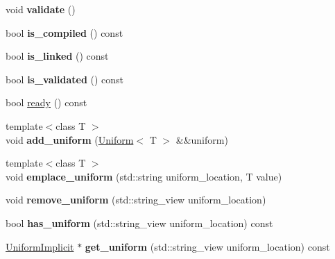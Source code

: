 \begin{DoxyCompactItemize}
\mbox{\label{class_shader_a63abb0b416f458680586b5606d8a4826}} 
void {\bfseries validate} ()
\item 
\mbox{\label{class_shader_a7d734904868dd336e52071d92230bbeb}} 
bool {\bfseries is\+\_\+compiled} () const
\item 
\mbox{\label{class_shader_a9eb0765e36b74d8dcd4afb62df04d024}} 
bool {\bfseries is\+\_\+linked} () const
\item 
\mbox{\label{class_shader_a731afb1a870977aa3eb91168f752b2e8}} 
bool {\bfseries is\+\_\+validated} () const
\item 
bool \mbox{\hyperlink{class_shader_a8053fc5d01642d3d985e233835065e13}{ready}} () const
\item 
\mbox{\label{class_shader_a2f7b0cd2bd3226c76ea2f766a59fbb58}} 
{\footnotesize template$<$class T $>$ }\\void {\bfseries add\+\_\+uniform} (\mbox{\hyperlink{class_uniform}{Uniform}}$<$ T $>$ \&\&uniform)
\item 
\mbox{\label{class_shader_ae34ad0d3352ed22322dcbe1d1ef0740b}} 
{\footnotesize template$<$class T $>$ }\\void {\bfseries emplace\+\_\+uniform} (std\+::string uniform\+\_\+location, T value)
\item 
\mbox{\label{class_shader_a46dbb0b323be10d61496452cde5aa756}} 
void {\bfseries remove\+\_\+uniform} (std\+::string\+\_\+view uniform\+\_\+location)
\item 
\mbox{\label{class_shader_a370621cc5d76a859ee9a610dc8b27d82}} 
bool {\bfseries has\+\_\+uniform} (std\+::string\+\_\+view uniform\+\_\+location) const
\item 
\mbox{\label{class_shader_a00310ce243076cdf51e84d1107142abf}} 
\mbox{\hyperlink{class_uniform_implicit}{Uniform\+Implicit}} $\ast$ {\bfseries get\+\_\+uniform} (std\+::string\+\_\+view uniform\+\_\+location) const
\item 
\mbox{\label{class_shader_abeb49b89007eae2e82a7d95192e326e4}} 

\end{DoxyCompactItemize}
